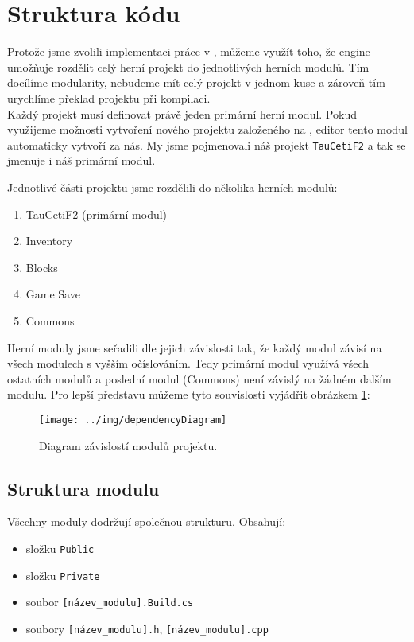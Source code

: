 
\section{Struktura kódu}

Protože jsme zvolili implementaci práce v \UE{}, můžeme využít toho, že engine umožňuje rozdělit celý herní projekt do jednotlivých herních modulů\citep{epicGameplayModules}. Tím docílíme modularity, nebudeme mít celý projekt v jednom kuse a zároveň tím urychlíme překlad projektu při kompilaci.\\
Každý \UE{} projekt musí definovat právě jeden primární herní modul. Pokud využijeme možnosti vytvoření nového projektu založeného na \CPP{}, editor tento modul automaticky vytvoří za nás. My jsme pojmenovali náš projekt {\tt TauCetiF2} a tak se jmenuje i náš primární modul.

Jednotlivé části projektu jsme rozdělili do několika herních modulů:

\begin{enumerate}
	\item TauCetiF2 (primární modul)
	\item Inventory
	\item Blocks
	\item Game Save
	\item Commons
\end{enumerate}

Herní moduly jsme seřadili dle jejich závislosti tak, že každý modul závisí na všech modulech s vyšším očíslováním. Tedy primární modul využívá všech ostatních modulů a poslední modul (Commons) není závislý na žádném dalším modulu. Pro lepší představu můžeme tyto souvislosti vyjádřit obrázkem \ref{fig:obrStruktura_DependencyDiag}: 

\begin{figure}[!ht]\centering
\texttt{[image: ../img/dependencyDiagram]}

\caption{Diagram závislostí modulů projektu.}
\label{fig:obrStruktura_DependencyDiag}

\end{figure}



\subsection{Struktura modulu}
Všechny moduly dodržují společnou strukturu. Obsahují:
\begin{itemize}
	\item složku \verb!Public!
	\item složku \verb!Private!
	\item soubor \verb![název_modulu].Build.cs!
	\item soubory \verb![název_modulu].h!, \verb![název_modulu].cpp!
\end{itemize}


